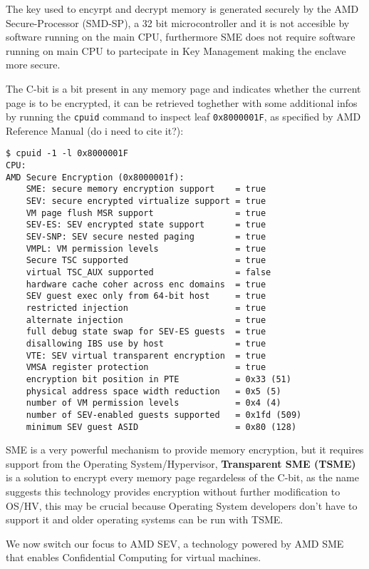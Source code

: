 \documentclass[twocolumn]{article}
\begin{document}
The key used to encyrpt and decrypt memory is generated securely by the AMD Secure-Processor (SMD-SP), a 32 bit microcontroller and it is not accesible by software running on the main CPU, furthermore SME does not require software running on main CPU to partecipate in Key Management making the enclave more secure.

The C-bit is a bit present in any memory page and indicates whether the current page is to be encrypted, it can be retrieved toghether with some additional infos by running the \texttt{cpuid} command to inspect leaf \texttt{0x8000001F}, as specified by AMD Reference Manual (do i need to cite it?):

\begin{verbatim}
$ cpuid -1 -l 0x8000001F
CPU:
AMD Secure Encryption (0x8000001f):
    SME: secure memory encryption support    = true
    SEV: secure encrypted virtualize support = true
    VM page flush MSR support                = true
    SEV-ES: SEV encrypted state support      = true
    SEV-SNP: SEV secure nested paging        = true
    VMPL: VM permission levels               = true
    Secure TSC supported                     = true
    virtual TSC_AUX supported                = false
    hardware cache coher across enc domains  = true
    SEV guest exec only from 64-bit host     = true
    restricted injection                     = true
    alternate injection                      = true
    full debug state swap for SEV-ES guests  = true
    disallowing IBS use by host              = true
    VTE: SEV virtual transparent encryption  = true
    VMSA register protection                 = true
    encryption bit position in PTE           = 0x33 (51)
    physical address space width reduction   = 0x5 (5)
    number of VM permission levels           = 0x4 (4)
    number of SEV-enabled guests supported   = 0x1fd (509)
    minimum SEV guest ASID                   = 0x80 (128)
\end{verbatim}
    
SME is a very powerful mechanism to provide memory encryption, but it requires support from the Operating System/Hypervisor, \textbf{Transparent SME (TSME)} is a solution to encrypt every memory page regardeless of the C-bit, as the name suggests this technology provides encryption without further modification to OS/HV, this may be crucial because Operating System developers don't have to support it and older operating systems can be run with TSME.

We now switch our focus to AMD SEV, a technology powered by AMD SME that enables Confidential Computing for virtual machines.
\end{document}
